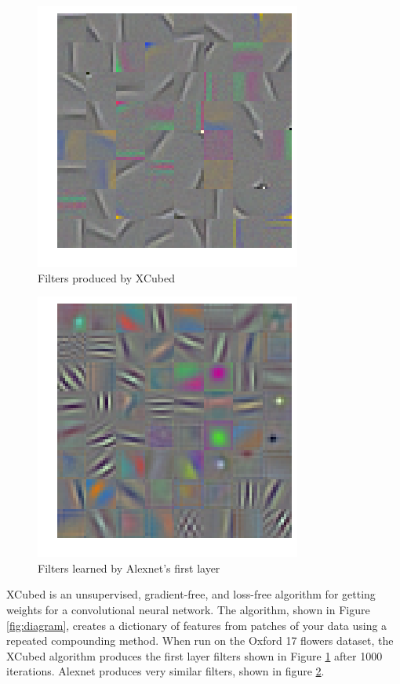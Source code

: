 \documentclass{article}
\begin{document}
\begin{figure}
    \centering
    \includegraphics[width=.8\linewidth]{x3filters}
    \caption{Filters produced by XCubed}
    \label{fig:x3weights}
\end{figure}
\begin{figure}
    \centering
    \includegraphics[width=.8\linewidth]{trainedfet}
    \caption{Filters learned by Alexnet's first layer}
    \label{fig:learnedweights}
\end{figure}
XCubed is an unsupervised, gradient-free, and loss-free algorithm for getting weights for a convolutional neural network. The algorithm, shown in Figure \ref{fig:diagram}, creates a dictionary of features from patches of your data using a repeated compounding method. When run on the Oxford 17 flowers dataset, the XCubed algorithm produces the first layer filters shown in Figure \ref{fig:x3weights} after 1000 iterations. Alexnet produces very similar filters, shown in figure \ref{fig:learnedweights}.
\end{document}
